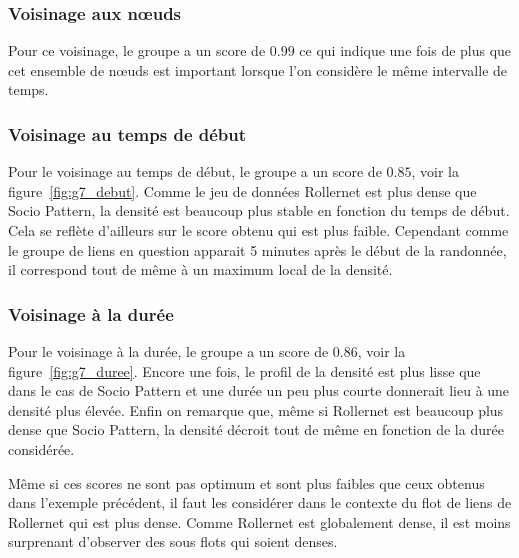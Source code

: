 \subsubsection*{Voisinage aux n\oe uds}
Pour ce voisinage, le groupe a un score de $0.99$ ce qui indique une fois de plus que cet ensemble de n\oe uds est important lorsque l'on considère le même intervalle de temps.

\subsubsection*{Voisinage au temps de début}
Pour le voisinage au temps de début, le groupe a un score de $0.85$, voir la figure~\ref{fig:g7_debut}.
Comme le jeu de données Rollernet est plus dense que Socio Pattern, la densité est beaucoup plus stable en fonction du temps de début.
Cela se reflète d'ailleurs sur le score obtenu qui est plus faible.
Cependant comme le groupe de liens en question apparait 5 minutes après le début de la randonnée, il correspond tout de même à un maximum local de la densité.


\subsubsection*{Voisinage à la durée}
Pour le voisinage à la durée, le groupe a un score de $0.86$, voir la figure~\ref{fig:g7_duree}.
Encore une fois, le profil de la densité est plus lisse que dans le cas de Socio Pattern et une durée un peu plus courte donnerait lieu à une densité plus élevée.
Enfin on remarque que, même si Rollernet est beaucoup plus dense que Socio Pattern, la densité décroit tout de même en fonction de la durée considérée.

\bigskip

Même si ces scores ne sont pas optimum et sont plus faibles que ceux obtenus dans l'exemple précédent, il faut les considérer dans le contexte du flot de liens de Rollernet qui est plus dense.
Comme Rollernet est globalement dense, il est moins surprenant d'observer des sous flots qui soient denses.
 

